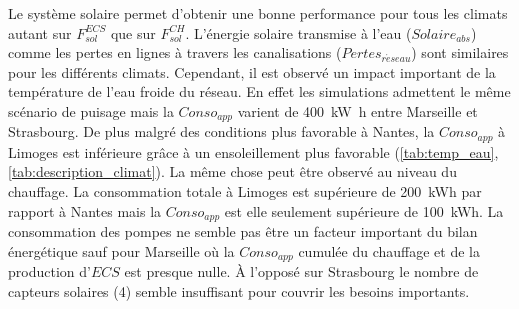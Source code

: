 Le système solaire permet d’obtenir une bonne performance pour tous les climats autant sur
$F_{sol}^{ECS}$ que sur $F_{sol}^{CH}$. L’énergie solaire transmise à l’eau ($Solaire_{abs}$) comme
les pertes en lignes à travers les canalisations ($Pertes_{r\acute eseau}$) sont similaires pour
les différents climats. Cependant, il est observé un impact important de la température
de l’eau froide du réseau. En effet les simulations admettent le même scénario de puisage
mais la $Conso_{app}$ varient de \SI{400}{\kilo\watt\hour} entre Marseille et Strasbourg.
De plus malgré des conditions plus favorable à Nantes, la $Conso_{app}$ à
Limoges est inférieure grâce à un ensoleillement plus favorable (\autoref{tab:temp_eau},
\autoref{tab:description_climat}). La même chose peut être observé au niveau du chauffage.
La consommation totale à Limoges est supérieure de \SI{200}{kWh} par rapport à Nantes mais
la $Conso_{app}$ est elle seulement supérieure de \SI{100}{kWh}.
La consommation des pompes ne semble pas être un facteur important du bilan énergétique sauf pour
Marseille où la $Conso_{app}$ cumulée du chauffage et de la
production d’$ECS$ est presque nulle. À l’opposé sur Strasbourg le nombre
de capteurs solaires (4) semble insuffisant pour couvrir les besoins importants.

